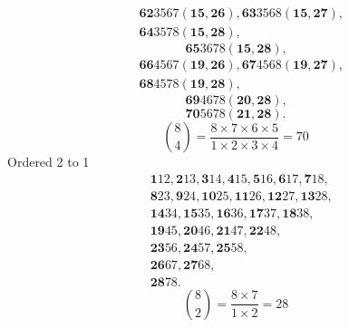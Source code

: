 \documentclass[aps, preprint]{revtex4}
\begin{document}
\begin{align} & \mathbf{62}3567 \left (\mathbf{15} ,\mathbf{26}\right ) ,\mathbf{63}3568 \left (\mathbf{15} ,\mathbf{27}\right )\text{,} \\
 & \mathbf{64}3578 \left (\mathbf{15} ,\mathbf{28}\right )\text{,}\end{align}
\begin{equation}\mathbf{65}3678 \left (\mathbf{15} ,\mathbf{28}\right )\text{,}
\end{equation}
\begin{align} & \mathbf{66}4567 \left (\mathbf{19} ,\mathbf{26}\right ) ,\mathbf{67}4568 \left (\mathbf{19} ,\mathbf{27}\right )\text{,} \\
 & \mathbf{68}4578 \left (\mathbf{19} ,\mathbf{28}\right )\text{,}\end{align}
\begin{equation}\mathbf{69}4678 \left (\mathbf{20} ,\mathbf{28}\right )\text{,}
\end{equation}
\begin{equation}\mathbf{70}5678 \left (\mathbf{21} ,\mathbf{28}\right )\text{.}
\end{equation}
\begin{equation}\binom{8}{4} =\frac{8 \times 7 \times 6 \times 5}{1 \times 2 \times 3 \times 4} =70
\end{equation}Ordered 2 to 1
\begin{align} & \mathbf{1}12 ,\mathbf{2}13 ,\mathbf{3}14 ,\mathbf{4}15 ,\mathbf{5}16 ,\mathbf{6}17 ,\mathbf{7}18\text{,} \\
 & \mathbf{8}23 ,\mathbf{9}24 ,\mathbf{10}25 ,\mathbf{11}26 ,\mathbf{12}27 ,\mathbf{13}28\text{,} \\
 & \mathbf{14}34 ,\mathbf{15}35 ,\mathbf{16}36 ,\mathbf{17}37 ,\mathbf{18}38\text{,} \\
 & \mathbf{19}45 ,\mathbf{20}46 ,\mathbf{21}47 ,\mathbf{22}48\text{,} \\
 & \mathbf{23}56 ,\mathbf{24}57 ,\mathbf{25}58\text{,} \\
 & \mathbf{26}67 ,\mathbf{27}68\text{,} \\
 & \mathbf{28}78.\end{align}
\begin{equation}\binom{8}{2} =\frac{8 \times 7}{1 \times 2} =28
\end{equation}
\end{document}
